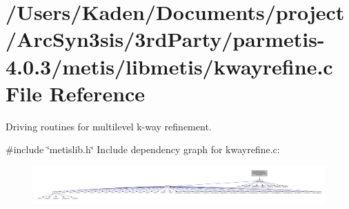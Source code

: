 \hypertarget{a00915}{}\section{/\+Users/\+Kaden/\+Documents/project/\+Arc\+Syn3sis/3rd\+Party/parmetis-\/4.0.3/metis/libmetis/kwayrefine.c File Reference}
\label{a00915}


Driving routines for multilevel k-\/way refinement.  


{\ttfamily \#include \char`\"{}metislib.\+h\char`\"{}}\newline
Include dependency graph for kwayrefine.\+c\+:\nopagebreak
\begin{figure}[H]
\begin{center}
\leavevmode
\includegraphics[width=350pt]{a00916}
\end{center}
\end{figure}

